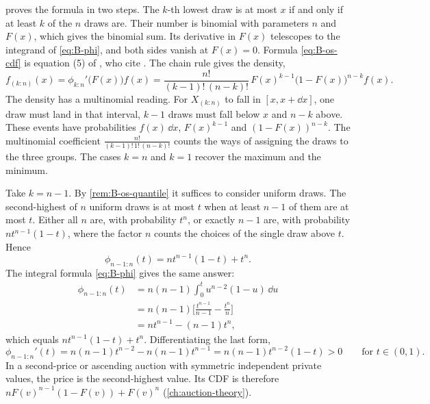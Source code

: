  proves the formula in two steps. The $k$-th lowest draw is at most $x$ if and only if
at least $k$ of the $n$ draws are. Their number is binomial with parameters $n$ and $F(x)$, which gives the
binomial sum. Its derivative in $F(x)$ telescopes to the integrand of \eqref{eq:B-phi}, and both sides vanish at
$F(x) = 0$. Formula \eqref{eq:B-os-cdf} is equation (5) of \citet{AtheyHaile2002}, who cite
\citet{ArnoldBalakrishnanNagaraja1992}. The chain rule gives the density,
\begin{equation}\label{eq:B-os-density}
  f_{(k:n)}(x) = \phi_{k:n}'\big(F(x)\big)f(x)
  = \frac{n!}{(k-1)!\,(n-k)!}\,F(x)^{k-1}\big(1 - F(x)\big)^{n-k}f(x).
\end{equation}
The density has a multinomial reading. For $X_{(k:n)}$ to fall in $[x, x + \dd x]$, one draw must land in
that interval, $k-1$ draws must fall below $x$ and $n-k$ above. These events have probabilities $f(x)\,\dd
x$, $F(x)^{k-1}$ and $(1 - F(x))^{n-k}$. The multinomial coefficient $\frac{n!}{(k-1)!\,1!\,(n-k)!}$ counts
the ways of assigning the draws to the three groups. The cases $k = n$ and $k = 1$ recover the maximum and
the minimum.

\begin{example}\label{ex:B-second-highest}
Take $k = n-1$. By \cref{rem:B-os-quantile} it suffices to consider uniform draws. The second-highest of $n$
uniform draws is at most $t$ when at least $n-1$ of them are at most $t$. Either all $n$ are, with probability $t^n$, or exactly $n-1$ are, with probability
$nt^{n-1}(1-t)$, where the factor $n$ counts the choices of the single draw above $t$. Hence
\begin{equation*}
  \phi_{n-1:n}(t) = nt^{n-1}(1-t) + t^n.
\end{equation*}
The integral formula \eqref{eq:B-phi} gives the same answer:
\begin{align*}
  \phi_{n-1:n}(t) &= n(n-1)\int_0^t u^{n-2}(1-u)\,\dd u \\
  &= n(n-1)\Big[\frac{t^{n-1}}{n-1} - \frac{t^n}{n}\Big] \\
  &= nt^{n-1} - (n-1)t^n,
\end{align*}
which equals $nt^{n-1}(1-t) + t^n$. Differentiating the last form,
\begin{equation*}
  \phi_{n-1:n}'(t) = n(n-1)t^{n-2} - n(n-1)t^{n-1} = n(n-1)t^{n-2}(1-t) > 0 \qquad \text{for } t \in (0,1).
\end{equation*}
In a second-price or ascending auction with symmetric independent private values, the price is the
second-highest value. Its CDF is therefore $nF(v)^{n-1}(1 - F(v)) + F(v)^n$ (\cref{ch:auction-theory}).
\end{example}

